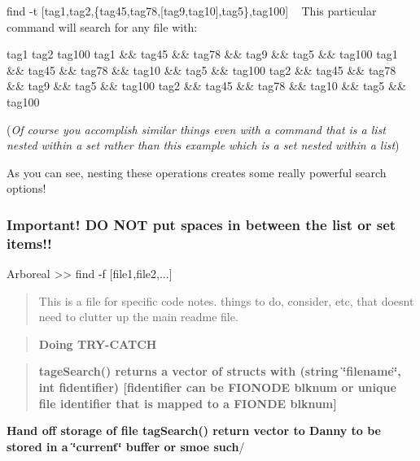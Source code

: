 {\ttfamily find -\/t \mbox{[}tag1,tag2,\{tag45,tag78,\mbox{[}tag9,tag10\mbox{]},tag5\},tag100\mbox{]}} ~\newline
 This particular command will search for any file with\+: ~\newline
 
\begin{DoxyCode}
tag1     
tag2  
tag100  
tag1 && tag45 && tag78 && tag9 && tag5 && tag100  
tag1 && tag45 && tag78 && tag10 && tag5 && tag100  
tag2 && tag45 && tag78 && tag9 && tag5 && tag100  
tag2 && tag45 && tag78 && tag10 && tag5 && tag100 
\end{DoxyCode}


({\itshape Of course you accomplish similar things even with a command that is a {\ttfamily list} nested within a {\ttfamily set} rather than this example which is a {\ttfamily set} nested within a {\ttfamily list}})

As you can see, nesting these operations creates some really powerful search options! ~\newline
\subsubsection*{Important! DO N\+OT put spaces in between the {\ttfamily list} or {\ttfamily set} items!!}


\begin{DoxyItemize}
\item 
\begin{DoxyCode}
Arboreal >> find -f [file1,file2,...]
\end{DoxyCode}

\end{DoxyItemize}

\begin{quote}
This is a file for specific code notes. things to do, consider, etc, that doesn\textquotesingle{}t need to clutter up the main readme file. \end{quote}


\begin{quote}
{\bfseries Doing T\+R\+Y-\/\+C\+A\+T\+CH} \end{quote}


\begin{quote}
{\bfseries tage\+Search() returns a vector of structs with (string \char`\"{}filename\char`\"{}, int fidentifier) \mbox{[}fidentifier can be F\+I\+O\+N\+O\+DE blknum or unique file identifier that is mapped to a F\+I\+O\+N\+DE blknum\mbox{]}} \end{quote}
{\bfseries Hand off storage of file tag\+Search() return vector to Danny to be stored in a \char`\"{}current\char`\"{} buffer or smoe such}/

